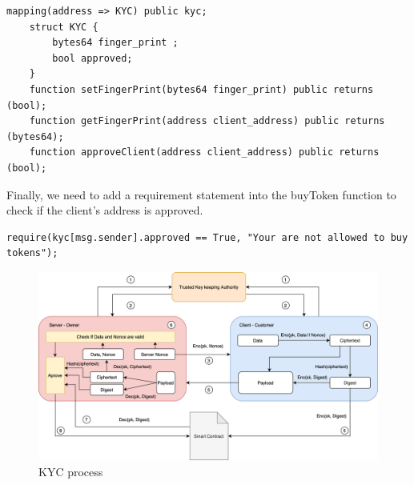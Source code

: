 \documentclass[12pt,a4paper]{article}
\begin{document}
\begin{lstlisting}[language=Solidity]
    mapping(address => KYC) public kyc;
    struct KYC {
        bytes64 finger_print ;
        bool approved;
    }
    function setFingerPrint(bytes64 finger_print) public returns (bool);
    function getFingerPrint(address client_address) public returns (bytes64);
    function approveClient(address client_address) public returns (bool);
\end{lstlisting}

Finally, we need to add a requirement statement into the buyToken function to
check if the client's address is approved.  \\

\begin{lstlisting}[language=Solidity]
    require(kyc[msg.sender].approved == True, "Your are not allowed to buy tokens");
\end{lstlisting}

\begin{figure}[htpb]
    \begin{center}
        \includegraphics[width=18cm]{kyc.png}
        \caption{KYC process}
        \label{fig:kyc-process}
    \end{center}
\end{figure} 
\end{document}
